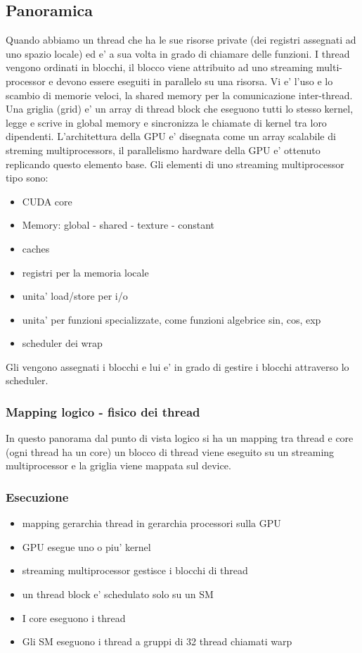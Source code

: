 \subsection{Panoramica}

Quando abbiamo un thread che ha le sue risorse private (dei registri assegnati ad uno spazio locale) ed e' a sua volta in grado di chiamare delle funzioni. I thread vengono ordinati in blocchi, il blocco viene attribuito ad uno streaming multi-processor e devono essere eseguiti in parallelo su una risorsa. Vi e' l'uso e lo scambio di memorie veloci, la shared memory per la comunicazione inter-thread. Una griglia (grid) e' un array di thread block che eseguono tutti lo stesso kernel, legge e scrive in global memory e sincronizza le chiamate di kernel tra loro dipendenti.
L'architettura della GPU e' disegnata come un array scalabile di streming multiprocessors, il parallelismo hardware della GPU e' ottenuto replicando questo elemento base.
Gli elementi di uno streaming multiprocessor tipo sono:
\begin{itemize}
    \item CUDA core
    \item Memory: global - shared - texture - constant
    \item caches
    \item registri per la memoria locale
    \item unita' load/store per i/o
    \item unita' per funzioni specializzate, come funzioni algebrice sin, cos, exp
    \item scheduler dei wrap
\end{itemize}
Gli vengono assegnati i blocchi e lui e' in grado di gestire i blocchi attraverso lo scheduler.

\subsubsection{Mapping logico - fisico dei thread}
In questo panorama dal punto di vista logico si ha un mapping tra thread e core (ogni thread ha un core) un blocco di thread viene eseguito su un streaming multiprocessor e la griglia viene mappata sul device.

\subsubsection{Esecuzione}
\begin{itemize}
    \item mapping gerarchia thread in gerarchia processori sulla GPU
    \item GPU esegue uno o piu' kernel
    \item streaming multiprocessor gestisce i blocchi di thread
    \item un thread block e' schedulato solo su un SM 
    \item I core eseguono i thread
    \item Gli SM eseguono i thread a gruppi di 32 thread chiamati warp
\end{itemize}

